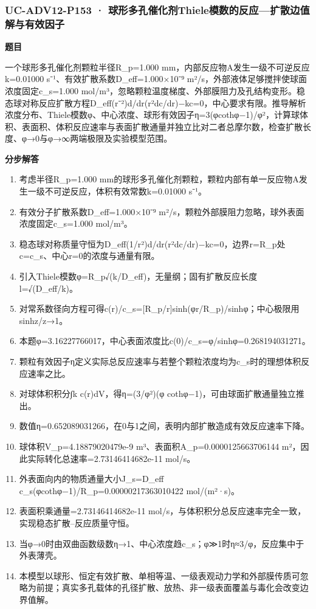 \documentclass[UTF8,11pt,a4paper]{ctexart}
\begin{document}
\subsubsection*{UC-ADV12-P153 · 球形多孔催化剂Thiele模数的反应—扩散边值解与有效因子}
\noindent\textbf{题目}\par
一个球形多孔催化剂颗粒半径R\_p=1.000 mm，内部反应物A发生一级不可逆反应k=0.01000 s⁻¹、有效扩散系数D\_eff=1.000×10⁻⁹ m²/s，外部液体足够搅拌使球面浓度固定c\_s=1.000 mol/m³，忽略颗粒温度梯度、外部膜阻力及孔结构变形。稳态球对称反应扩散方程D\_eff(r⁻²)d/dr(r²dc/dr)−kc=0，中心要求有限。推导解析浓度分布、Thiele模数φ、中心浓度、球形有效因子η=3(φcothφ−1)/φ²，计算球体积、表面积、体积反应速率与表面扩散通量并独立比对二者总摩尔数，检查扩散长度、φ→0与φ→∞两端极限及实验模型范围。\par
\medskip\noindent\textbf{分步解答}
\begin{enumerate}
\item 考虑半径R\_p=1.000 mm的球形多孔催化剂颗粒，颗粒内部有单一反应物A发生一级不可逆反应，体积有效常数k=0.01000 s⁻¹。
\item 有效分子扩散系数D\_eff=1.000×10⁻⁹ m²/s，颗粒外部膜阻力忽略，球外表面浓度固定c\_s=1.000 mol/m³。
\item 稳态球对称质量守恒为D\_eff(1/r²)d/dr(r²dc/dr)−kc=0，边界r=R\_p处c=c\_s、中心r=0的浓度与通量有限。
\item 引入Thiele模数φ=R\_p√(k/D\_eff)，无量纲；固有扩散反应长度l=√(D\_eff/k)。
\item 对常系数径向方程可得c(r)/c\_s=[R\_p/r]sinh(φr/R\_p)/sinhφ；中心极限用sinhz/z→1。
\item 本题φ=3.16227766017，中心表面浓度比c(0)/c\_s=φ/sinhφ=0.268194031271。
\item 颗粒有效因子η定义实际总反应速率与若整个颗粒浓度均为c\_s时的理想体积反应速率之比。
\item 对球体积积分∫k c(r)dV，得η=(3/φ²)(φ cothφ−1)，可由球面扩散通量独立推出。
\item 数值η=0.652089031266，在0与1之间，表明内部扩散造成有效反应速率下降。
\item 球体积V\_p=4.18879020479e-9 m³、表面积A\_p=0.0000125663706144 m²，因此实际转化总速率=2.73146414682e-11 mol/s。
\item 外表面向内的物质通量大小J\_s=D\_eff c\_s(φcothφ−1)/R\_p=0.00000217363010422 mol/(m²·s)。
\item 表面积乘通量=2.73146414682e-11 mol/s，与体积积分总反应速率完全一致，实现稳态扩散–反应质量守恒。
\item 当φ→0时由双曲函数级数η→1、中心浓度趋c\_s；φ≫1时η≈3/φ，反应集中于外表薄壳。
\item 本模型以球形、恒定有效扩散、单相等温、一级表观动力学和外部膜传质可忽略为前提；真实多孔载体的孔径扩散、放热、非一级表面覆盖与毒化会改变边界值解。
\end{enumerate}
\end{document}
